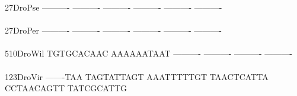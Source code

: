 \documentclass[11pt,twoside,reqno,a4paper]{article}
\begin{document}
{27\hspace*{3\charwidth}DroPse	----------	----------	----------	----------	----------	----------	\\
\hspace*{5\charwidth}\hspace*{7\charwidth}\hspace*{1\charwidth}\hspace*{1\charwidth}\hspace*{1\charwidth}\hspace*{1\charwidth}\hspace*{1\charwidth}\hspace*{1\charwidth}\\
27\hspace*{3\charwidth}DroPer	----------	----------	----------	----------	----------	----------	\\
\hspace*{5\charwidth}\hspace*{7\charwidth}\hspace*{1\charwidth}\hspace*{1\charwidth}\hspace*{1\charwidth}\hspace*{1\charwidth}\hspace*{1\charwidth}\hspace*{1\charwidth}\\
510\hspace*{2\charwidth}DroWil	TGTGCACAAC	AAAAAATAAT	----------	----------	----------	----------	\\
\hspace*{5\charwidth}\hspace*{7\charwidth}\hspace*{1\charwidth}\hspace*{1\charwidth}\hspace*{1\charwidth}\hspace*{1\charwidth}\hspace*{1\charwidth}\hspace*{1\charwidth}\\
123\hspace*{2\charwidth}DroVir	-------TAA	TAGTATTAGT	AAATTTTTGT	TAACTCATTA	CCTAACAGTT	TATCGCATTG	\\
\hspace*{5\charwidth}\hspace*{7\charwidth}\hspace*{1\charwidth}\hspace*{1\charwidth}\hspace*{1\charwidth}\hspace*{1\charwidth}\hspace*{1\charwidth}\hspace*{1\charwidth}\\
}
\end{document}
